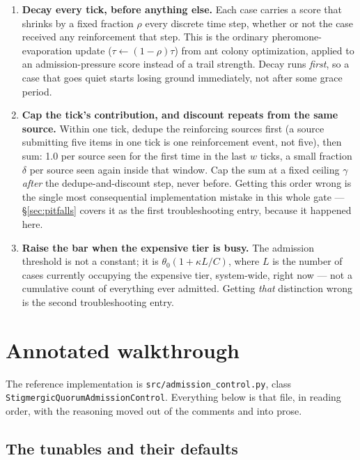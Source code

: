 \documentclass[11pt]{article}
\begin{document}
\begin{enumerate}
\item \textbf{Decay every tick, before anything else.} Each case carries
  a score that shrinks by a fixed fraction $\rho$ every discrete time
  step, whether or not the case received any reinforcement that step.
  This is the ordinary pheromone-evaporation update
  ($\tau \leftarrow (1-\rho)\tau$) from ant colony optimization, applied
  to an admission-pressure score instead of a trail strength. Decay runs
  \emph{first}, so a case that goes quiet starts losing ground
  immediately, not after some grace period.
\item \textbf{Cap the tick's contribution, and discount repeats from the
  same source.} Within one tick, dedupe the reinforcing sources first
  (a source submitting five items in one tick is one reinforcement
  event, not five), then sum: 1.0 per source seen for the first time in
  the last $w$ ticks, a small fraction $\delta$ per source seen again
  inside that window. Cap the sum at a fixed ceiling $\gamma$
  \emph{after} the dedupe-and-discount step, never before. Getting this
  order wrong is the single most consequential implementation mistake in
  this whole gate --- \S\ref{sec:pitfalls} covers it as the first
  troubleshooting entry, because it happened here.
\item \textbf{Raise the bar when the expensive tier is busy.} The
  admission threshold is not a constant; it is
  $\theta_0(1 + \kappa L/C)$, where $L$ is the number of cases currently
  occupying the expensive tier, system-wide, right now --- not a
  cumulative count of everything ever admitted. Getting \emph{that}
  distinction wrong is the second troubleshooting entry.
\end{enumerate}

\section{Annotated walkthrough}
\label{sec:walkthrough}

The reference implementation is \texttt{src/admission\_control.py},
class \texttt{StigmergicQuorumAdmissionControl}. Everything below is
that file, in reading order, with the reasoning moved out of the
comments and into prose.

\subsection{The tunables and their defaults}
\end{document}
